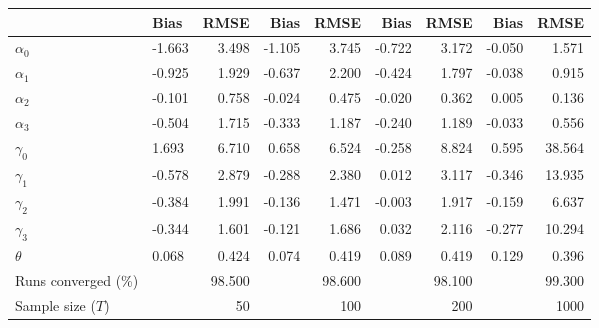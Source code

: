 
\begin{tabular}[t]{llrrrrrrr}
\toprule
  & Bias & RMSE & Bias & RMSE & Bias & RMSE & Bias & RMSE\\
\midrule
$\alpha_{0}$ & -1.663 & 3.498 & -1.105 & 3.745 & -0.722 & 3.172 & -0.050 & 1.571\\
$\alpha_{1}$ & -0.925 & 1.929 & -0.637 & 2.200 & -0.424 & 1.797 & -0.038 & 0.915\\
$\alpha_{2}$ & -0.101 & 0.758 & -0.024 & 0.475 & -0.020 & 0.362 & 0.005 & 0.136\\
$\alpha_{3}$ & -0.504 & 1.715 & -0.333 & 1.187 & -0.240 & 1.189 & -0.033 & 0.556\\
$\gamma_{0}$ & 1.693 & 6.710 & 0.658 & 6.524 & -0.258 & 8.824 & 0.595 & 38.564\\
$\gamma_{1}$ & -0.578 & 2.879 & -0.288 & 2.380 & 0.012 & 3.117 & -0.346 & 13.935\\
$\gamma_{2}$ & -0.384 & 1.991 & -0.136 & 1.471 & -0.003 & 1.917 & -0.159 & 6.637\\
$\gamma_{3}$ & -0.344 & 1.601 & -0.121 & 1.686 & 0.032 & 2.116 & -0.277 & 10.294\\
$\theta$ & 0.068 & 0.424 & 0.074 & 0.419 & 0.089 & 0.419 & 0.129 & 0.396\\
Runs converged (\%) &  & 98.500 &  & 98.600 &  & 98.100 &  & 99.300\\
Sample size ($T$) &  & 50 &  & 100 &  & 200 &  & 1000\\
\bottomrule
\end{tabular}

